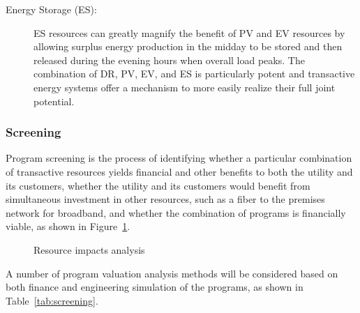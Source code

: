 \begin{description}
    \item[Energy Storage (ES):] ES resources can greatly magnify the benefit of PV and EV resources by allowing surplus energy production in the midday to be stored and then released during the evening hours when overall load peaks.  The combination of DR, PV, EV, and ES is particularly potent and transactive energy systems offer a mechanism to more easily realize their full joint potential.

\end{description}

\subsubsection{Screening}

Program screening is the process of identifying whether a particular combination of transactive resources yields financial and other benefits to both the utility and its customers, whether the utility and its customers would benefit from simultaneous investment in other resources, such as a fiber to the premises network for broadband, and whether the combination of programs is financially viable, as shown in Figure~\ref{fig:impact_analysis}.
\begin{figure}[!t]
    \centerline { \scalebox{0.72} { }}
    \caption{Resource impacts analysis}
    \label{fig:impact_analysis}
\end{figure}
A number of program valuation analysis methods will be considered based on both finance and engineering simulation of the programs, as shown in Table~\ref{tab:screening}. 
